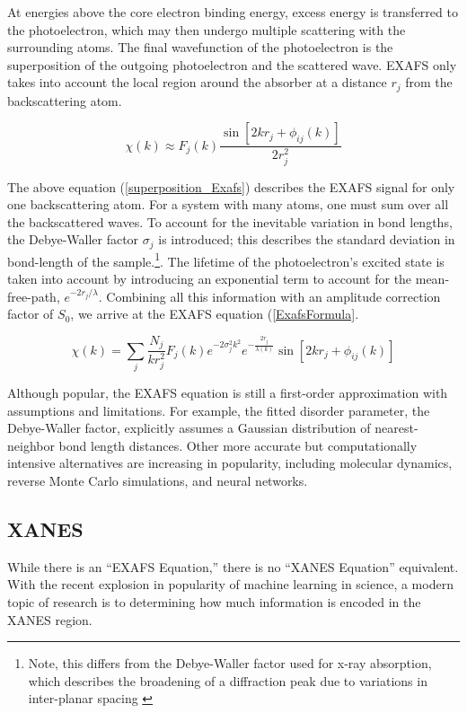 At energies above the core electron binding energy, excess energy is transferred to the photoelectron, which may then undergo multiple scattering with the surrounding atoms. The final wavefunction of the photoelectron is the superposition of the outgoing photoelectron and the scattered wave. EXAFS only takes into account the local region around the absorber at a distance $ r_j $  from the backscattering atom.

\begin{equation}
    \label{superposition_Exafs}
    \chi(k) \approx F_j(k) \dfrac{\sin[2kr_j + \phi_{ij}(k)]}{2r_j^2}
\end{equation}

The above equation (\ref{superposition_Exafs}) describes the EXAFS signal for only one backscattering atom. For a system with many atoms, one must sum over all the backscattered waves. To account for the inevitable variation in bond lengths, the Debye-Waller factor $ \sigma_j $ is introduced; this describes the standard deviation in bond-length of the sample.\footnote{Note, this differs from the Debye-Waller factor used for x-ray absorption, which describes the broadening of a diffraction peak due to variations in inter-planar spacing \cite{DW-diffraction}}. The lifetime of the photoelectron's excited state is taken into account by introducing an exponential term to account for the mean-free-path, $ e^{-2r_j/\lambda} $. Combining all this information with an amplitude correction factor of $ S_0 $, we arrive at the EXAFS equation (\ref{ExafsFormula}. 

\begin{equation}
    \label{ExafsFormula}
    \chi(k) = \sum_j \frac{N_j}{kr_j^2}F_j(k)e^{-2\sigma_j^2k^2}e^{-\tfrac{2r_j}{\lambda(k)}}\sin[2kr_j + \phi_{ij}(k)]
\end{equation}

Although popular, the EXAFS equation is still a first-order approximation with assumptions and limitations. For example, the fitted disorder parameter, the Debye-Waller factor, explicitly assumes a Gaussian distribution of nearest-neighbor bond length distances. Other more accurate but computationally intensive alternatives are increasing in popularity, including molecular dynamics, reverse Monte Carlo simulations, and neural networks.

\subsection{XANES}
While there is an ``EXAFS Equation,'' there is no ``XANES Equation'' equivalent. With the recent explosion in popularity of machine learning in science, a modern topic of research is to determining how much information is encoded in the XANES region.

